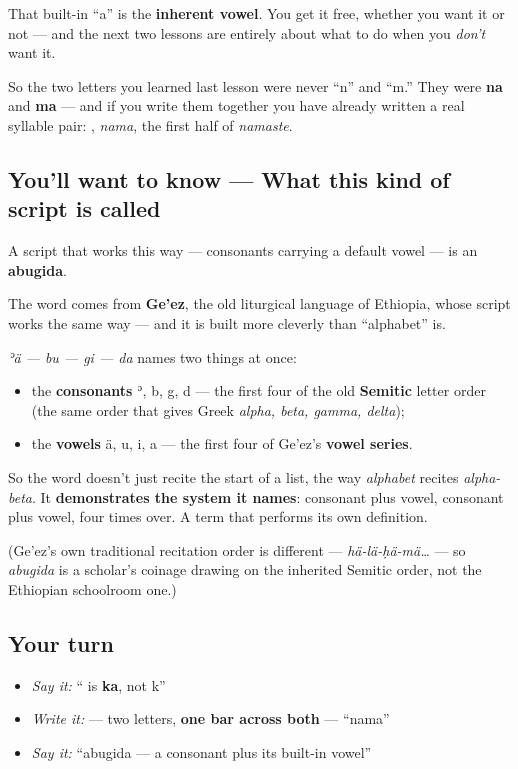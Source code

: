 That built-in \textquotedblleft{}a\textquotedblright{} is the \textbf{inherent vowel}. You get it free, whether you want it or not — and the next two lessons are entirely about what to do when you \emph{don't} want it.

So the two letters you learned last lesson were never \textquotedblleft{}n\textquotedblright{} and \textquotedblleft{}m.\textquotedblright{} They were \textbf{na} and \textbf{ma} — and if you write them together you have already written a real syllable pair: \textbf{}, \emph{nama}, the first half of \emph{namaste}.

\subsection*{You'll want to know — What this kind of script is called}
A script that works this way — consonants carrying a default vowel — is an \textbf{abugida}.

The word comes from \textbf{Ge'ez}, the old liturgical language of Ethiopia, whose script works the same way — and it is built more cleverly than \textquotedblleft{}alphabet\textquotedblright{} is.

\emph{ʾä — bu — gi — da} names two things at once:

\begin{itemize}
\raggedright
  \item the \textbf{consonants} ʾ, b, g, d — the first four of the old \textbf{Semitic} letter order (the same order that gives Greek \emph{alpha, beta, gamma, delta});
  \item the \textbf{vowels} ä, u, i, a — the first four of Ge'ez's \textbf{vowel series}.
\end{itemize}

So the word doesn't just recite the start of a list, the way \emph{alphabet} recites \emph{alpha-beta}. It \textbf{demonstrates the system it names}: consonant plus vowel, consonant plus vowel, four times over. A term that performs its own definition.

(Ge'ez's own traditional recitation order is different — \emph{hä-lä-ḥä-mä…} — so \emph{abugida} is a scholar's coinage drawing on the inherited Semitic order, not the Ethiopian schoolroom one.)

\subsection*{Your turn}
\begin{itemize}
\raggedright
  \item \emph{Say it:} \textquotedblleft{} is \textbf{ka}, not k\textquotedblright{}
  \item \emph{Write it:}  — two letters, \textbf{one bar across both} — \textquotedblleft{}nama\textquotedblright{}
  \item \emph{Say it:} \textquotedblleft{}abugida — a consonant plus its built-in vowel\textquotedblright{}
\end{itemize}

